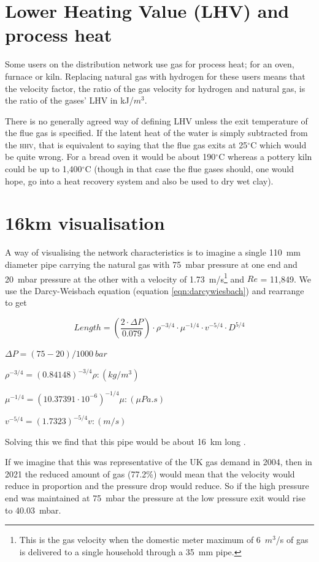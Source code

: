 \documentclass[5p]{elsarticle} %
\begin{document}
\section{Lower Heating Value (LHV) and process heat}
\label{sec:processheat}
Some users on the distribution network use gas for process heat;  for an oven, furnace or kiln. Replacing natural gas with hydrogen for these users means that the velocity factor, the ratio of the gas velocity for hydrogen and natural gas, is the ratio of the gases' LHV  in kJ/$m^3$.

There is no generally agreed  way of defining LHV unless the exit temperature of the flue gas is specified. If the latent heat of the water is simply subtracted from the \textsc{hhv}, that is equivalent to saying that the flue gas exits at 25$^\circ$C which would be quite wrong. For a bread oven it would be about 190$^\circ$C whereas a pottery kiln could be up to 1,400$^\circ$C (though in that case the flue gases should, one would hope, go into a heat recovery system and also be used to dry wet clay).


\section{16km visualisation}
\label{sec:18km}
A way of visualising the network characteristics is to imagine a single 110~mm diameter pipe carrying the natural gas with 75~mbar pressure at one end and 20~mbar pressure at the other with a velocity of 1.73~m/s\footnote{
This is the gas velocity when the domestic meter maximum of 6~$m^3$/s of gas is delivered to a single household through a 35~mm pipe.
}  and $Re$ = 11,849. We use the Darcy-Weisbach equation (equation \ref{eqn:darcywiesbach}) and rearrange to get


\begin{equation}
\label{eqn:18km0}
Length = \left ( \frac{2 \cdot \Delta P}{0.079}\right ) \cdot \rho^{-3/4} \cdot \mu^{-1/4} \cdot v^{-5/4}  \cdot D^{5/4}
\end{equation}

$ \Delta P = (75 - 20)/1000~bar$

$ \rho^{-3/4} = (0.84148)^{-3/4} \rho: (kg/m^3)$

$ \mu^{-1/4} = (10.37391 \cdot 10^{-6})^{-1/4} \mu:  (\mu Pa.s)$

$ v^{-5/4} = (1.7323)^{-5/4} v: (m/s)$

Solving this we find that this pipe would be about 16~km long .

If we imagine that this was representative of the UK gas demand in 2004, then in 2021 the reduced amount of gas (77.2\%) would mean that the velocity would reduce in proportion and the pressure drop would reduce. So if the high pressure end was maintained at 75~mbar the  pressure at the low pressure exit would rise to 40.03~mbar. 
\end{document}
